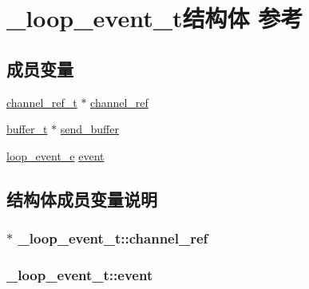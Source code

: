 \hypertarget{a00023}{}\section{\+\_\+loop\+\_\+event\+\_\+t结构体 参考}
\label{a00023}
\subsection*{成员变量}
\begin{DoxyCompactItemize}
\item 
\hyperlink{a00044_a151271c9d188ef28d4d24bb81dcc1263_a151271c9d188ef28d4d24bb81dcc1263}{channel\+\_\+ref\+\_\+t} $\ast$ \hyperlink{a00023_a004e7698edee7fd1b94b08f4be4f0ad1_a004e7698edee7fd1b94b08f4be4f0ad1}{channel\+\_\+ref}
\item 
\hyperlink{a00044_aad99a77d28bd81d3d36d0ea569c9482d_aad99a77d28bd81d3d36d0ea569c9482d}{buffer\+\_\+t} $\ast$ \hyperlink{a00023_a95cfa23b9392db798b8fbcc41f094614_a95cfa23b9392db798b8fbcc41f094614}{send\+\_\+buffer}
\item 
\hyperlink{a00052_ab92fe4e788615cfd56530167651a8ff4_ab92fe4e788615cfd56530167651a8ff4}{loop\+\_\+event\+\_\+e} \hyperlink{a00023_a76dd6f9dca6bec4527fbe55184812a70_a76dd6f9dca6bec4527fbe55184812a70}{event}
\end{DoxyCompactItemize}


\subsection{结构体成员变量说明}
\hypertarget{a00023_a004e7698edee7fd1b94b08f4be4f0ad1_a004e7698edee7fd1b94b08f4be4f0ad1}{}
\subsubsection[{channel\+\_\+ref}]{$\ast$ \+\_\+loop\+\_\+event\+\_\+t\+::channel\+\_\+ref}\label{a00023_a004e7698edee7fd1b94b08f4be4f0ad1_a004e7698edee7fd1b94b08f4be4f0ad1}
\hypertarget{a00023_a76dd6f9dca6bec4527fbe55184812a70_a76dd6f9dca6bec4527fbe55184812a70}{}
\subsubsection[{event}]{ \+\_\+loop\+\_\+event\+\_\+t\+::event}\label{a00023_a76dd6f9dca6bec4527fbe55184812a70_a76dd6f9dca6bec4527fbe55184812a70}
\hypertarget{a00023_a95cfa23b9392db798b8fbcc41f094614_a95cfa23b9392db798b8fbcc41f094614}{}

